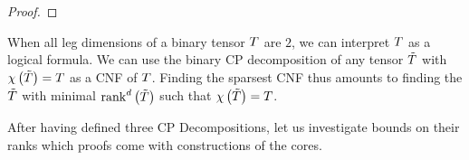 \begin{proof}
\end{proof}



\begin{example}
	When all leg dimensions of a binary tensor $T$ are $2$, we can interpret $T$ as a logical formula.
	We can use the binary CP decomposition of any tensor $\tilde{T}$ with $\chi\left(\tilde{T}\right)=T$ as a CNF of $T$.
	Finding the sparsest CNF thus amounts to finding the $\tilde{T}$ with minimal $\mathrm{rank}^{d}\left(\tilde{T}\right)$ such that $\chi\left(\tilde{T}\right)=T$.
\end{example}












After having defined three CP Decompositions, let us investigate bounds on their ranks which proofs come with constructions of the cores.


